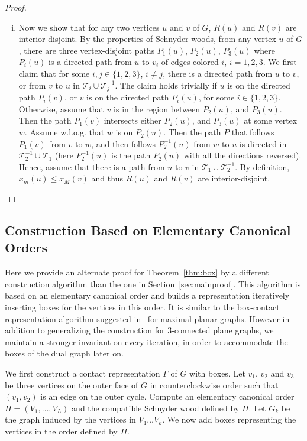 \documentclass{article}
\newcommand{\TT}{{\mathcal{T}}}
\newcommand{\WLOG}{w.l.o.g.\xspace}
\begin{document}
\begin{proof}
\begin{enumerate}[(i)]
\item Now we show that for any two vertices $u$ and $v$ of $G$, $R(u)$ and $R(v)$ are
 interior-disjoint. By the properties of Schnyder woods, from any vertex $u$ of $G$,
 there are three vertex-disjoint paths $P_1(u)$, $P_2(u)$, $P_3(u)$ where $P_i(u)$ is 
 a directed path from $u$ to $v_i$ of edges colored $i$, $i=1,2,3$.
We first claim that for some $i,j\in\{1,2,3\}$, $i\neq j$, there is a directed path from $u$ to $v$,
 or from $v$ to $u$ in $\TT_{i}\cup \TT_{j}^{-1}$. The claim holds trivially if $u$
 is on the directed path $P_i(v)$, or $v$ is on the directed path $P_i(u)$, for some $i\in\{1,2,3\}$.
 Otherwise, assume that $v$ is in the region between $P_2(u)$, and $P_3(u)$. Then the path $P_1(v)$
 intersects either $P_2(u)$, and $P_3(u)$ at some vertex $w$. Assume \WLOG that
 $w$ is on $P_2(u)$. Then the path $P$ that follows $P_1(v)$ from $v$ to $w$, and then follows
 $P_2^{-1}(u)$ from $w$ to $u$ is directed in $\TT_2^{-1}\cup\TT_1$ (here $P_2^{-1}(u)$ is the path
 $P_2(u)$ with all the directions reversed). Hence, assume that there is a path from $u$ to $v$ in
 $\TT_1\cup\TT_2^{-1}$. By definition, $x_m(u)\le x_M(v)$ and thus $R(u)$ and $R(v)$ are
 interior-disjoint.
\end{enumerate}\vspace{-0.7cm}
\end{proof}




\subsection{Construction Based on Elementary Canonical Orders}
\label{sec:alternateproof}

Here we provide an alternate proof for Theorem~\ref{thm:box} by a different construction algorithm
 than the one in Section~\ref{sec:mainproof}.
This algorithm is based on an elementary canonical order and builds a representation iteratively
 inserting boxes for the vertices in this order. It is similar to the box-contact representation algorithm
 suggested in~\cite{BEFHK+12} for maximal planar graphs. However in addition to generalizing the
 construction for $3$-connected plane graphs, we maintain a stronger invariant on every iteration,
 in order to accommodate the boxes of the dual graph later on.





We first construct a contact representation $\Gamma$ of $G$ with boxes.
Let $v_1$, $v_2$ and $v_3$ be three vertices on the outer face of $G$ in counterclockwise order
 such that $(v_1, v_2)$ is an edge on the outer cycle. Compute an elementary canonical
 order $\Pi=(V_1,\ldots,V_L)$ and the compatible Schnyder wood defined by $\Pi$.
Let $G_k$ be the graph induced by the vertices in $V_1\ldots V_k$. We now add boxes
 representing the vertices in the order defined by $\Pi$.
\end{document}
